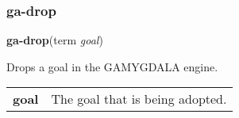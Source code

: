 \subsubsection{ga-drop}

\textbf{ga-drop}(term \emph{goal})\vspace{.5em}

\hspace{-\parindent}Drops a goal in the GAMYGDALA engine. \\[.4em]

\noindent
\begin{tabularx}{\textwidth}{@{}p{4cm} X}
	\textbf{goal} & The goal that is being adopted.\\
\end{tabularx}